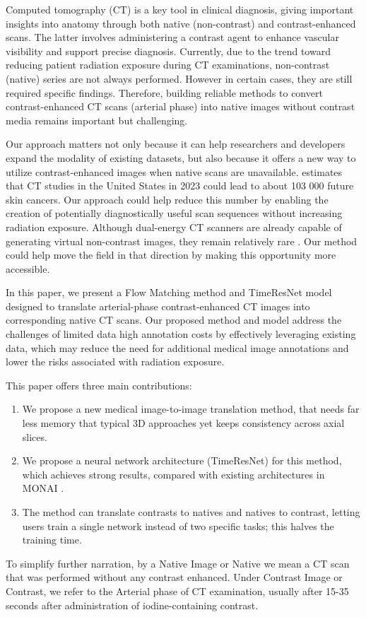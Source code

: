 \documentclass{article}
\begin{document}
Computed tomography (CT) is a key tool in clinical diagnosis, giving important insights into anatomy through both native (non-contrast) and contrast-enhanced scans. The latter involves administering a contrast agent to enhance vascular visibility and support precise diagnosis. Currently, due to the trend toward reducing patient radiation exposure during CT examinations, non-contrast (native) series are not always performed. However in certain cases, they are still required specific findings. Therefore, building reliable methods to convert contrast-enhanced CT scans (arterial phase) into native images without contrast media remains important but challenging.

Our approach matters not only because it can help researchers and developers expand the modality of existing datasets, but also because it offers a new way to utilize contrast-enhanced images when native scans are unavailable. \citep{10.1001/jamainternmed.2025.0505} estimates that CT studies in the United States in 2023 could lead to about 103 000 future skin cancers. Our approach could help reduce this number by enabling the creation of potentially diagnostically useful scan sequences without increasing radiation exposure. Although dual-energy CT scanners are already capable of generating virtual non-contrast images, they remain relatively rare \citep{VIRARKAR2022293}. Our method could help move the field in that direction by making this opportunity more accessible.

In this paper, we present a Flow Matching method and TimeResNet model designed to translate arterial-phase contrast-enhanced CT images into corresponding native CT scans. Our proposed method and model address the challenges of limited data high annotation costs by effectively leveraging existing data, which may reduce the need for additional medical image annotations and lower the risks associated with radiation exposure.

This paper offers three main contributions:
\begin{enumerate}
    \item We propose a new medical image-to-image translation method, that needs far less memory that typical 3D approaches yet keeps consistency across axial slices.
    \item We propose a neural network architecture (TimeResNet) for this method, which achieves strong results, compared with existing architectures in MONAI \citep{cardoso2022monai}.
    \item The method can translate contrasts to natives and natives to contrast, letting users train a single network instead of two specific tasks; this halves the training time.
\end{enumerate}
To simplify further narration, by a Native Image or Native we mean a CT scan that was performed without any contrast enhanced. Under Contrast Image or Contrast, we refer to the Arterial phase of CT examination, usually after 15-35 seconds after administration of iodine-containing contrast.
\end{document}
